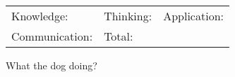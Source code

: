 \documentclass[12pt,a4paper,addpoints]{exam}
\begin{document}
\begin{tabularx}{\textwidth}{@{}XXX@{}}
    Knowledge: & Thinking: & Application: \\ Communication: & Total: 
\end{tabularx}
\vspace{1em}

\begin{questions}
    \question[10] What the dog doing?
\end{questions}
\end{document}
